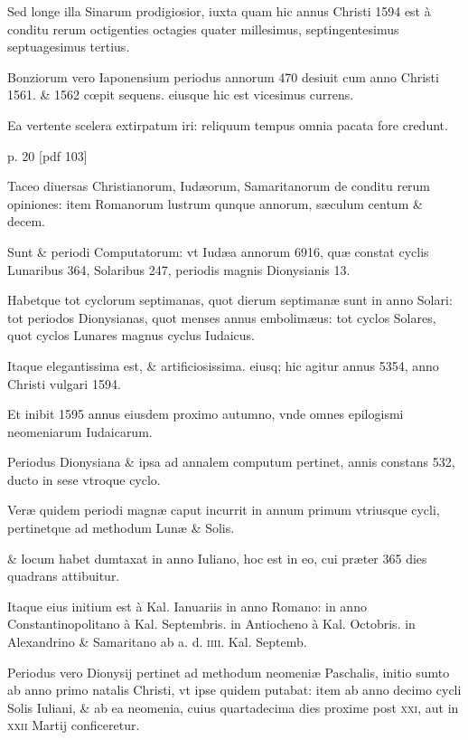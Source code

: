 \begin{parnumbers}
Sed longe illa Sinarum prodigiosior, iuxta quam hic annus Christi
1594 est à conditu rerum octigenties octagies quater millesimus,
septingentesimus septuagesimus tertius.

Bonziorum vero Iaponensium
periodus annorum 470 desiuit cum anno Christi 1561. \& 1562
cœpit sequens. eiusque hic est vicesimus currens.

Ea vertente scelera
extirpatum iri: reliquum tempus omnia pacata fore credunt.

\end{parnumbers}
\clearpage
p. 20 [pdf 103]
\begin{parnumbers}

Taceo
diuersas Christianorum, Iudæorum, Samaritanorum de conditu rerum
opiniones: item Romanorum lustrum qunque annorum, sæculum
centum \& decem.

Sunt \& periodi Computatorum: vt Iudæa
annorum 6916, quæ constat cyclis Lunaribus 364, Solaribus 247, periodis
magnis Dionysianis 13.

Habetque tot cyclorum septimanas,
quot dierum septimanæ sunt in anno Solari: tot periodos Dionysianas,
quot menses annus embolimæus: tot cyclos Solares, quot cyclos
Lunares magnus cyclus Iudaicus.

Itaque elegantissima est, \& artificiosissima.
eiusq; hic agitur annus 5354, anno Christi vulgari 1594.

Et inibit 1595 annus eiusdem proximo autumno, vnde omnes epilogismi
neomeniarum Iudaicarum.

Periodus Dionysiana \& ipsa ad
annalem computum pertinet, annis constans 532, ducto in sese vtroque
cyclo.

Veræ quidem periodi magnæ caput incurrit in annum
primum vtriusque cycli, pertinetque ad methodum Lunæ \& Solis.

\&
locum habet dumtaxat in anno Iuliano, hoc est in eo, cui præter 365
dies quadrans attibuitur.

Itaque eius initium est à Kal. Ianuariis in
anno Romano: in anno Constantinopolitano à Kal. Septembris. in
Antiocheno à Kal. Octobris. in Alexandrino \& Samaritano ab a. d.
\textsc{iiii}. Kal. Septemb.

Periodus vero Dionysij pertinet ad methodum
neomeniæ Paschalis, initio sumto ab anno primo natalis Christi, vt
ipse quidem putabat: item ab anno decimo cycli Solis Iuliani, \& ab
ea neomenia, cuius quartadecima dies proxime post
 \textsc{xxi}, aut in \textsc{xxii}
Martij conficeretur.


\end{parnumbers}
